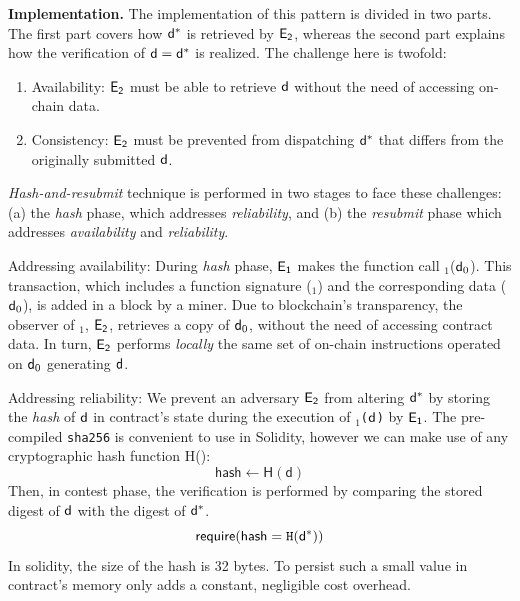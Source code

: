 \noindent \textbf{Implementation.} The implementation of this pattern is
divided in two parts. The first part covers how $\mathsf{d^*}$ is retrieved by
$\mathsf{E_{2}}$, whereas the second part explains how the verification of
$\mathsf{d}=\mathsf{d^*}$ is realized. The challenge here is twofold:

\begin{enumerate}

    \item Availability: $\mathsf{E_{2}}$ must be able to retrieve $\mathsf{d}$ without
        the need of accessing on-chain data.

    \item Consistency: $\mathsf{E_{2}}$ must be prevented from dispatching $\mathsf{d^*}$
        that differs from the originally submitted $\mathsf{d}$.

\end{enumerate}

\noindent
\emph{Hash-and-resubmit} technique is performed in two
stages to face these challenges: (a) the \emph{hash} phase, which addresses
\emph{reliability}, and (b) the \emph{resubmit} phase which addresses
\emph{availability} and \emph{reliability}.

\noindent \textsf{Addressing availability:} During \emph{hash} phase,
$\mathsf{E_{1}}$ makes the function call \texttt{\proc}$_1$($\mathsf{d}_0$). This
transaction, which includes a function signature (\texttt{\proc$_1$}) and the
corresponding data ($\mathsf{d}_0$), is added in a block by a miner. Due to
blockchain's transparency, the observer of \texttt{\proc}$_1$, $\mathsf{E_{2}}$,
retrieves a copy of $\mathsf{d}_0$, without the need of accessing contract data. In
turn, $\mathsf{E_{2}}$ performs \emph{locally} the same set of on-chain instructions
operated on $\mathsf{d}_0$ generating $\mathsf{d}$.

\noindent \textsf{Addressing reliability:} We prevent an adversary $\mathsf{E_{2}}$
from altering $\mathsf{d^*}$ by storing the \emph{hash} of $\mathsf{d}$ in contract's
state during the execution of \texttt{\proc$_1$($\mathsf{d}$)} by $\mathsf{E_{1}}$.  The
pre-compiled \texttt{sha256} is convenient to  use in Solidity, however we can
make use of any cryptographic hash function \textsf{H()}: \[\textsf{hash} \gets
\textsf{H}(\textsf{d})\] Then, in contest phase, the verification is performed
by comparing the stored digest of $\mathsf{d}$ with the digest of $\mathsf{d^*}$.
\[\textsf{require}(\textsf{hash} = \texttt{H}(\mathsf{d^*}))\] \noindent In solidity,
the size of the hash is 32 bytes. To persist such a small value in contract's
memory only adds a constant, negligible cost overhead.

